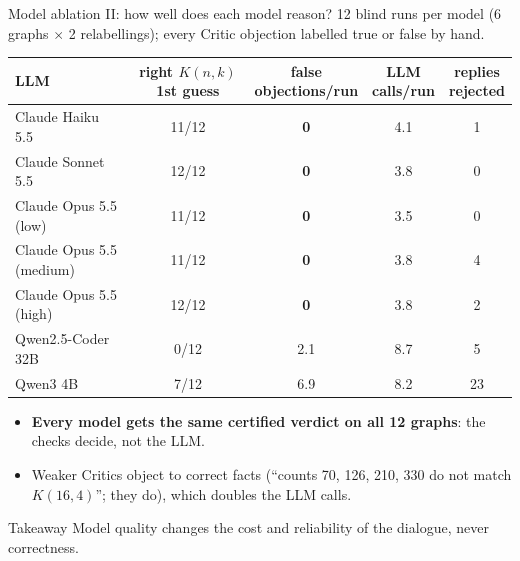 \documentclass[11pt]{beamer}
\begin{document}
\begin{frame}{Model ablation II: how well does each model reason?}
  \small
  12 blind runs per model (6 graphs $\times$ 2 relabellings); every Critic objection labelled true or false by hand.\par\medskip
  \centering\footnotesize
  \begin{tabular}{@{}lcccc@{}}
    \toprule
    LLM & \shortstack{right $K(n,k)$\\1st guess} & \shortstack{false\\objections/run} & \shortstack{LLM\\calls/run}
        & \shortstack{replies\\rejected} \\
    \midrule
    Claude Haiku 5.5      & 11/12 & \textbf{0} & 4.1 & 1 \\
    Claude Sonnet 5.5     & 12/12 & \textbf{0} & 3.8 & 0 \\
    Claude Opus 5.5 (low)   & 11/12 & \textbf{0} & 3.5 & 0 \\
    Claude Opus 5.5 (medium) & 11/12 & \textbf{0} & 3.8 & 4 \\
    Claude Opus 5.5 (high)  & 12/12 & \textbf{0} & 3.8 & 2 \\
    \midrule
    Qwen2.5-Coder 32B     & 0/12  & 2.1 & 8.7 & 5 \\
    Qwen3 4B              & 7/12  & 6.9 & 8.2 & 23 \\
    \bottomrule
  \end{tabular}
  \raggedright
  \begin{itemize}\footnotesize\setlength\itemsep{1pt}
    \item \textbf{Every model gets the same certified verdict on all 12 graphs}: the checks decide, not the LLM.
    \item Weaker Critics object to correct facts (``counts 70, 126, 210, 330 do not match $K(16,4)$''; they do),
          which doubles the LLM calls.
  \end{itemize}
  \begin{alertblock}{Takeaway}\scriptsize
    Model quality changes the cost and reliability of the dialogue, never correctness.
  \end{alertblock}
\end{frame}
\end{document}
